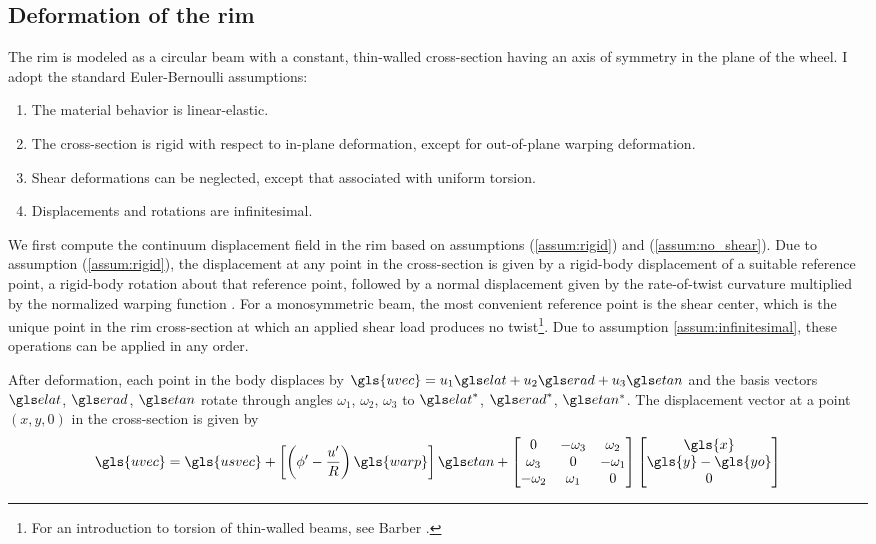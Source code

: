 \documentclass[\rootdir/thesis.tex]{subfiles}
\begin{document}
\subsection{Deformation of the rim}
\label{sec:rim_strain_energy}

The rim is modeled as a circular beam with a constant, thin-walled cross-section having an axis of symmetry in the plane of the wheel. I adopt the standard Euler-Bernoulli assumptions:

\begin{enumerate}
	\item{The material behavior is linear-elastic.}\label{assum:elastic}
	\item{The cross-section is rigid with respect to in-plane deformation, except for out-of-plane warping deformation.}\label{assum:rigid}
	\item{Shear deformations can be neglected, except that associated with uniform torsion.}\label{assum:no_shear}
	\item{Displacements and rotations are infinitesimal.}\label{assum:infinitesimal}
\end{enumerate}

We first compute the continuum displacement field in the rim based on assumptions (\ref{assum:rigid}) and (\ref{assum:no_shear}). Due to assumption (\ref{assum:rigid}), the displacement at any point in the cross-section is given by a rigid-body displacement of a suitable reference point, a rigid-body rotation about that reference point, followed by a normal displacement given by the rate-of-twist curvature multiplied by the normalized warping function \cite{warping mechanics}. For a monosymmetric beam, the most convenient reference point is the shear center, which is the unique point in the rim cross-section at which an applied shear load produces no twist\footnote{For an introduction to torsion of thin-walled beams, see Barber \cite{Barber2011}.}. Due to assumption \ref{assum:infinitesimal}, these operations can be applied in any order.

After deformation, each point in the body displaces by $\gls{uvec}= u_1\eo + u_2\et + u_3\eh$ and the basis vectors $\eo$, $\et$, $\eh$ rotate through angles $\omega_1$, $\omega_2$, $\omega_3$ to $\eo^*$, $\et^*$, $\eh^*$. The displacement vector at a point $(x, y, 0)$ in the cross-section is given by
\begin{equation}
\label{eq:u}
\gls{uvec} = \gls{usvec} + \left[\left(\phi' - \frac{u'}{R}\right)\gls{warp}\right]\eh +
\begin{bmatrix}
0        & -\omega_3& \omega_2\\
\omega_3 & 0        & -\omega_1\\
-\omega_2& \omega_1 & 0
\end{bmatrix}
\begin{bmatrix}\gls{x}\\\gls{y} - \gls{yo}\\0\end{bmatrix}
\end{equation}
\end{document}
